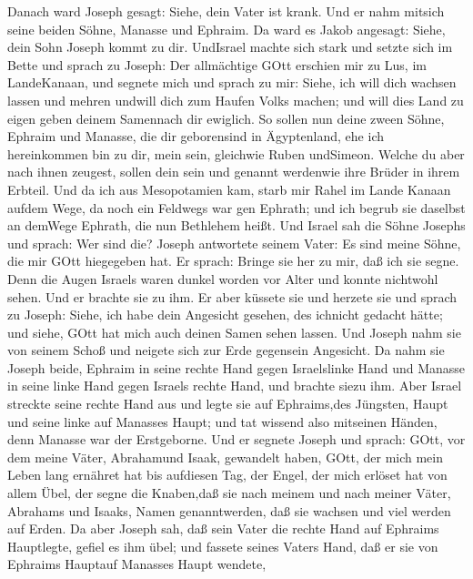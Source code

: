  Danach ward Joseph gesagt: Siehe, dein Vater ist krank. Und
er nahm mitsich seine beiden Söhne, Manasse und Ephraim.  Da
ward es Jakob angesagt: Siehe, dein Sohn Joseph kommt zu dir. UndIsrael
machte sich stark und setzte sich im Bette  und sprach zu
Joseph: Der allmächtige GOtt erschien mir zu Lus, im LandeKanaan, und
segnete mich  und sprach zu mir: Siehe, ich will dich
wachsen lassen und mehren undwill dich zum Haufen Volks machen; und will
dies Land zu eigen geben deinem Samennach dir ewiglich.  So
sollen nun deine zween Söhne, Ephraim und Manasse, die dir geborensind
in Ägyptenland, ehe ich hereinkommen bin zu dir, mein sein, gleichwie
Ruben undSimeon.  Welche du aber nach ihnen zeugest, sollen
dein sein und genannt werdenwie ihre Brüder in ihrem Erbteil.
 Und da ich aus Mesopotamien kam, starb mir Rahel im Lande
Kanaan aufdem Wege, da noch ein Feldwegs war gen Ephrath; und ich begrub
sie daselbst an demWege Ephrath, die nun Bethlehem heißt. 
Und Israel sah die Söhne Josephs und sprach: Wer sind die? 
Joseph antwortete seinem Vater: Es sind meine Söhne, die mir GOtt
hiegegeben hat. Er sprach: Bringe sie her zu mir, daß ich sie segne.
 Denn die Augen Israels waren dunkel worden vor Alter und
konnte nichtwohl sehen. Und er brachte sie zu ihm. Er aber küssete sie
und herzete sie  und sprach zu Joseph: Siehe, ich habe dein
Angesicht gesehen, des ichnicht gedacht hätte; und siehe, GOtt hat mich
auch deinen Samen sehen lassen.  Und Joseph nahm sie von
seinem Schoß und neigete sich zur Erde gegensein Angesicht.
 Da nahm sie Joseph beide, Ephraim in seine rechte Hand
gegen Israelslinke Hand und Manasse in seine linke Hand gegen Israels
rechte Hand, und brachte siezu ihm.  Aber Israel streckte
seine rechte Hand aus und legte sie auf Ephraims,des Jüngsten, Haupt und
seine linke auf Manasses Haupt; und tat wissend also mitseinen Händen,
denn Manasse war der Erstgeborne.  Und er segnete Joseph
und sprach: GOtt, vor dem meine Väter, Abrahamund Isaak, gewandelt
haben, GOtt, der mich mein Leben lang ernähret hat bis aufdiesen Tag,
 der Engel, der mich erlöset hat von allem Übel, der segne
die Knaben,daß sie nach meinem und nach meiner Väter, Abrahams und
Isaaks, Namen genanntwerden, daß sie wachsen und viel werden auf Erden.
 Da aber Joseph sah, daß sein Vater die rechte Hand auf
Ephraims Hauptlegte, gefiel es ihm übel; und fassete seines Vaters Hand,
daß er sie von Ephraims Hauptauf Manasses Haupt wendete, 
